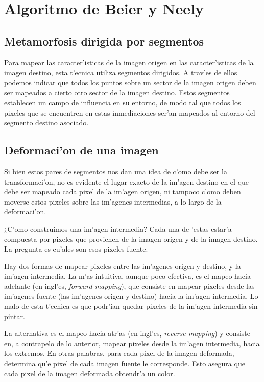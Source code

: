 \section{Algoritmo de Beier y Neely}

\subsection{Metamorfosis dirigida por segmentos}

Para mapear las caracter'isticas de la imagen origen en las caracter'isticas de la imagen destino, esta t'ecnica utiliza segmentos dirigidos. A trav'es de ellos podemos indicar que todos los puntos sobre un sector de la imagen origen deben ser mapeados a cierto otro sector de la imagen destino. Estos segmentos establecen un campo de influencia en su entorno, de modo tal que todos los pixeles que se encuentren en estas inmediaciones ser'an mapeados al entorno del segmento destino asociado.

\subsection{Deformaci'on de una imagen}

Si bien estos pares de segmentos nos dan una idea de c'omo debe ser la transformaci'on, no es evidente el lugar exacto de la im'agen destino en el que debe ser mapeado cada pixel de la im'agen origen, ni tampoco c'omo deben moverse estos pixeles sobre las im'agenes intermedias, a lo largo de la deformaci'on.

¿C'omo construimos una im'agen intermedia? Cada una de 'estas estar'a compuesta por pixeles que provienen de la imagen origen y de la imagen destino. La pregunta es cu'ales son esos pixeles fuente.

Hay dos formas de mapear pixeles entre las im'agenes origen y destino, y la im'agen intermedia. La m'as intuitiva, aunque poco efectiva, es el mapeo hacia adelante (en ingl'es, \textit{forward mapping}), que consiste en mapear pixeles desde las im'agenes fuente (las im'agenes origen y destino) hacia la im'agen intermedia. Lo malo de esta t'ecnica es que podr'ian quedar pixeles de la im'agen intermedia sin pintar.

La alternativa es el mapeo hacia atr'as (en ingl'es, \textit{reverse mapping}) y consiste en, a contrapelo de lo anterior, mapear pixeles desde la im'agen intermedia, hacia los extremos. En otras palabras, para cada pixel de la imagen deformada, determina qu'e pixel de cada imagen fuente le corresponde. Esto asegura que cada pixel de la imagen deformada obtendr'a un color.

